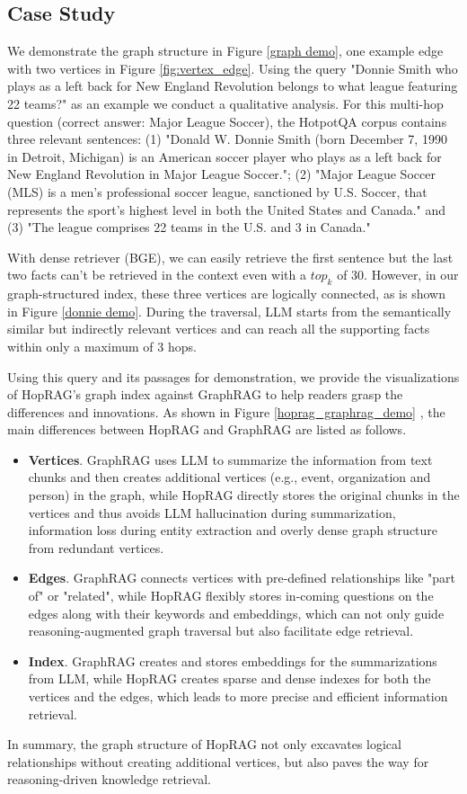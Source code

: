 \subsection{Case Study}
\label{case study}
We demonstrate the graph structure in Figure \ref{graph demo}, one example edge with two vertices in Figure \ref{fig:vertex_edge}. Using the query "Donnie Smith who plays as a left back for New England Revolution belongs to what league featuring 22 teams?" as an example we conduct a qualitative analysis. For this multi-hop question (correct answer: Major League Soccer), the HotpotQA corpus contains three relevant sentences: (1) "Donald W. Donnie Smith (born December 7, 1990 in Detroit, Michigan) is an American soccer player who plays as a left back for New England Revolution in Major League Soccer."; (2) "Major League Soccer (MLS) is a men's professional soccer league, sanctioned by U.S. Soccer, that represents the sport's highest level in both the United States and Canada." and (3) "The league comprises 22 teams in the U.S. and 3 in Canada." 

With dense retriever (BGE), we can easily retrieve the first sentence but the last two facts can't be retrieved in the context even with a $top_k$ of 30. However, in our graph-structured index, these three vertices are logically connected, as is shown in Figure \ref{donnie demo}. During the traversal, LLM starts from the semantically similar but indirectly relevant vertices and can reach all the supporting facts within only a maximum of 3 hops.

Using this query and its passages for demonstration, we provide the visualizations of HopRAG’s graph index against GraphRAG to help readers grasp the differences and innovations. As shown in Figure  \ref{hoprag_graphrag_demo} , the main differences between HopRAG and GraphRAG are listed as follows.
\begin{itemize}
    \item \textbf{Vertices}. GraphRAG uses LLM to summarize the information from text chunks and then creates additional vertices (e.g., event, organization and person) in the graph, while HopRAG directly stores the original chunks in the vertices and thus avoids LLM hallucination during summarization, information loss during entity extraction and overly dense graph structure from redundant vertices. 
    \item \textbf{Edges}. GraphRAG connects vertices with pre-defined relationships like "part of" or "related", while HopRAG flexibly stores in-coming questions on the edges along with their keywords and embeddings, which can not only guide reasoning-augmented graph traversal but also facilitate edge retrieval.
    \item \textbf{Index}. GraphRAG creates and stores embeddings for the summarizations from LLM, while HopRAG creates sparse and dense indexes for both the vertices and the edges, which leads to more precise and efficient information retrieval.
\end{itemize}
In summary, the graph structure of HopRAG not only excavates logical relationships without creating additional vertices, but also paves the way for reasoning-driven knowledge retrieval. 

